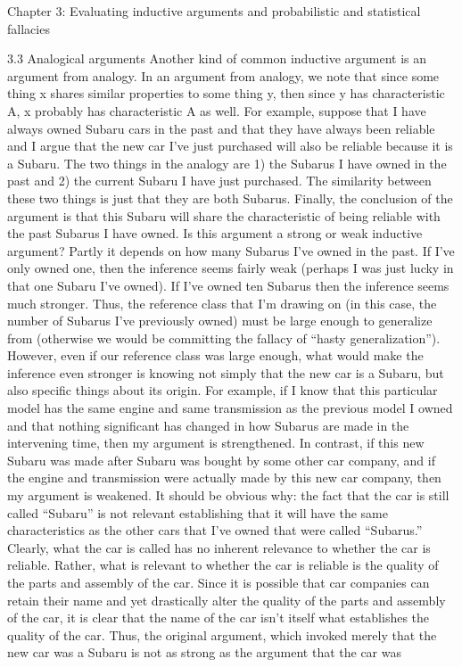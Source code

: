 Chapter 3: Evaluating inductive arguments and probabilistic and statistical fallacies

3.3 Analogical arguments
Another kind of common inductive argument is an argument from analogy. In
an argument from analogy, we note that since some thing x shares similar
properties to some thing y, then since y has characteristic A, x probably has
characteristic A as well. For example, suppose that I have always owned Subaru
cars in the past and that they have always been reliable and I argue that the new
car I’ve just purchased will also be reliable because it is a Subaru. The two
things in the analogy are 1) the Subarus I have owned in the past and 2) the
current Subaru I have just purchased. The similarity between these two things is
just that they are both Subarus. Finally, the conclusion of the argument is that
this Subaru will share the characteristic of being reliable with the past Subarus I
have owned. Is this argument a strong or weak inductive argument? Partly it
depends on how many Subarus I’ve owned in the past. If I’ve only owned one,
then the inference seems fairly weak (perhaps I was just lucky in that one Subaru
I’ve owned). If I’ve owned ten Subarus then the inference seems much stronger.
Thus, the reference class that I’m drawing on (in this case, the number of
Subarus I’ve previously owned) must be large enough to generalize from
(otherwise we would be committing the fallacy of “hasty generalization”).
However, even if our reference class was large enough, what would make the
inference even stronger is knowing not simply that the new car is a Subaru, but
also specific things about its origin. For example, if I know that this particular
model has the same engine and same transmission as the previous model I
owned and that nothing significant has changed in how Subarus are made in the
intervening time, then my argument is strengthened. In contrast, if this new
Subaru was made after Subaru was bought by some other car company, and if
the engine and transmission were actually made by this new car company, then
my argument is weakened. It should be obvious why: the fact that the car is still
called “Subaru” is not relevant establishing that it will have the same
characteristics as the other cars that I’ve owned that were called “Subarus.”
Clearly, what the car is called has no inherent relevance to whether the car is
reliable. Rather, what is relevant to whether the car is reliable is the quality of
the parts and assembly of the car. Since it is possible that car companies can
retain their name and yet drastically alter the quality of the parts and assembly
of the car, it is clear that the name of the car isn’t itself what establishes the
quality of the car. Thus, the original argument, which invoked merely that the
new car was a Subaru is not as strong as the argument that the car was

